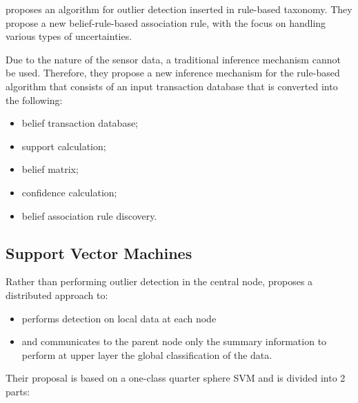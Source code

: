 \cite{class:islam:2016} proposes an algorithm for outlier detection inserted in rule-based taxonomy. They propose a new belief-rule-based association rule, with the focus on handling various types of uncertainties. 

Due to the nature of the sensor data, a traditional inference mechanism cannot be used. Therefore, they propose a new inference mechanism for the rule-based algorithm that consists of an input transaction database that is converted into the following:
\begin{itemize}
	\setlength\itemsep{-0.5em}
	\item belief transaction database;
	\item support calculation;
	\item belief matrix;
	\item confidence calculation;
	\item belief association rule discovery.
	
\end{itemize}


\vspace{1.5em}

\subsection{Support Vector Machines}
\label{subsec:svm}
Rather than performing outlier detection in the central node, \cite{class:rajasegarar:2007} proposes a 
distributed approach to:

\begin{itemize}
	\setlength\itemsep{-0.5em}
	\item performs detection on local data at each node
	\item and communicates to the parent node only the summary information to perform at upper layer the global classification of the data.	
\end{itemize}

Their proposal is based on a one-class quarter sphere SVM and is divided into 2 parts:

